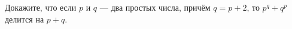 Докажите, что если $p$ и $q$ --- два простых числа, причём $q = p + 2$, то $p^q + q^p$ делится на $p + q$.